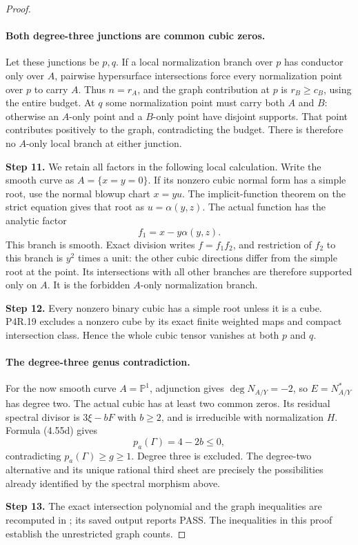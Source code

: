 \begin{proof}
\paragraph{Both degree-three junctions are common cubic zeros.}
Let these junctions be $p,q$. If a local normalization
branch over $p$ has conductor only over $A$, pairwise
hypersurface intersections force every normalization point
over $p$ to carry $A$. Thus $n=r_A$, and the graph
contribution at $p$ is $r_B\ge c_B$, using the entire
budget. At $q$ some normalization point must carry both
$A$ and $B$: otherwise an $A$-only point and a $B$-only
point have disjoint supports. That point contributes
positively to the graph, contradicting the budget. There
is therefore no $A$-only local branch at either junction.

\noindent\textbf{Step 11.} We retain all factors in the following local calculation.
Write the smooth curve as $A=\{x=y=0\}$. If its nonzero
cubic normal form has a simple root, use the normal blowup
chart $x=yu$. The implicit-function theorem on the strict
equation gives that root as $u=\alpha(y,z)$. The actual
function has the analytic factor
\[
                         f_1=x-y\alpha(y,z).
\]
This branch is smooth. Exact division writes $f=f_1f_2$,
and restriction of $f_2$ to this branch is $y^2$ times a
unit: the other cubic directions differ from the simple
root at the point. Its intersections with all other
branches are therefore supported only on $A$. It is the
forbidden $A$-only normalization branch.

\noindent\textbf{Step 12.} Every nonzero binary cubic has a simple root unless it is
a cube. P4R.19 excludes a nonzero cube by its exact finite
weighted maps and compact intersection class. Hence the
whole cubic tensor vanishes at both $p$ and $q$.

\paragraph{The degree-three genus contradiction.}
For the now smooth curve $A=\mathbb P^1$, adjunction gives
$\deg N_{A/Y}=-2$, so $E=N_{A/Y}^*$ has degree two.
The actual cubic has at least two common zeros. Its residual
spectral divisor is $3\xi-bF$ with $b\ge2$, and is
irreducible with normalization $H$. Formula (4.55d) gives
\[
                    p_a(\Gamma)=4-2b\le0,
\]
contradicting $p_a(\Gamma)\ge g\ge1$. Degree three is
excluded. The degree-two alternative and its unique rational
third sheet are precisely the possibilities already identified
by the spectral morphism above.

\noindent\textbf{Step 13.} The exact intersection polynomial and the graph inequalities
are recomputed in
; its saved output
reports PASS. The inequalities in this proof establish the
unrestricted graph counts.
\end{proof}


